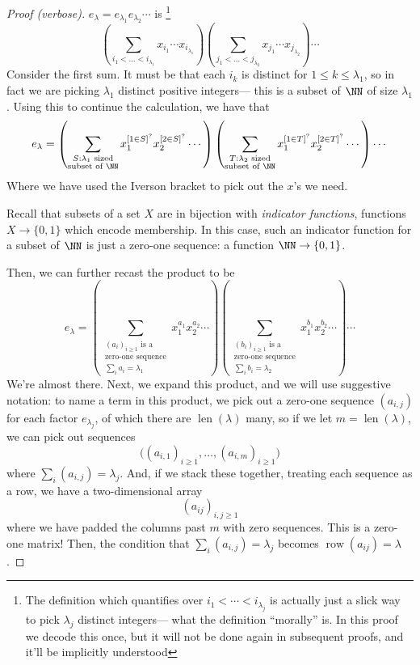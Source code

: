 \documentclass{article}
\DeclareMathOperator{\row}{row}
\DeclareMathOperator{\len}{len}
\begin{document}
\begin{proof}[Proof (verbose)]
    $e_\lambda = e_{\lambda_1}e_{\lambda_2}\cdots$ is \footnote{The definition which quantifies over $i_1 < \cdots < i_{\lambda_j}$ is actually just a slick way to pick $\lambda_j$ distinct integers--- what the definition ``morally'' is.
    In this proof we decode this once, but it will not be done again in subsequent proofs, and it'll be implicitly understood}
    \[
        \left(\sum_{i_1<\ldots<i_{\lambda_1}} x_{i_1}\cdots x_{i_{\lambda_1}}\right)
        \left(\sum_{j_1<\ldots<j_{\lambda_2}} x_{j_1}\cdots x_{j_{\lambda_2}}\right)\cdots
    \]
    Consider the first sum.
    It must be that each $i_k$ is distinct for $1 \leq k \leq \lambda_1$, so in fact we are picking $\lambda_1$ distinct positive integers--- this is a subset of $\NN$ of size $\lambda_1$.
    Using this to continue the calculation, we have that
    \[
        e_\lambda 
        =
        \left(\sum_{\substack{S:\lambda_1\text{ sized}\\\text{subset of }\NN}}x_1^{[1\in S]^?}x_2^{[2\in S]^?}\cdots\right)
        \left(\sum_{\substack{T:\lambda_2\text{ sized}\\\text{subset of }\NN}}x_1^{[1\in T]^?}x_2^{[2\in T]^?}\cdots\right)
        \cdots
    \]
    Where we have used the Iverson bracket to pick out the $x$'s we need.

    Recall that subsets of a set $X$ are in bijection with \textit{indicator functions}, functions $X \to \{0,1\}$ which encode membership.
    In this case, such an indicator function for a subset of $\NN$ is just a zero-one sequence: a function $\NN \to \{0,1\}$.

    Then, we can further recast the product to be
    \[
        e_\lambda 
        =
        \left(\sum_{\substack{(a_i)_{i\geq 1}\text{ is a}\\\text{zero-one sequence} \\ \sum_i a_i = \lambda_1}}x_1^{a_1}x_2^{a_2}\cdots\right)
        \left(\sum_{\substack{(b_i)_{i\geq 1}\text{ is a}\\\text{zero-one sequence} \\ \sum_i b_i = \lambda_2}}x_1^{b_1}x_2^{b_2}\cdots\right)
        \cdots
    \]
    We're almost there.
    Next, we expand this product, and we will use suggestive notation: to name a term in this product, we pick out a zero-one sequence $(a_{i,j})$ for each factor $e_{\lambda_j}$, of which there are $\len(\lambda)$ many, so if we let $m=\len(\lambda)$, we can pick out sequences
    \[
        \Big((a_{i,1})_{i\geq1},\ldots,(a_{i,m})_{i\geq1}\Big)
    \]
    where $\sum_i (a_{i,j}) = \lambda_j$.
    And, if we stack these together, treating each sequence as a row, we have a two-dimensional array
    \[
        (a_{ij})_{i,j \geq 1}
    \]
    where we have padded the columns past $m$ with zero sequences.
    This is a zero-one matrix!
    Then, the condition that $\sum_i (a_{i,j}) = \lambda_j$ becomes $\row(a_{ij}) = \lambda$.


\end{proof}
\end{document}
